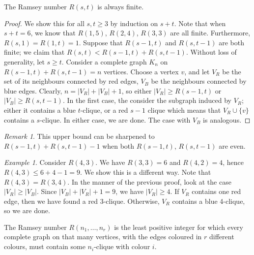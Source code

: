 \documentclass[11pt]{article}
\theoremstyle{definition}
\theoremstyle{remark}
\newtheorem*{remark}{Remark}
\newtheorem*{example}{Example}
\numberwithin{equation}{section}
\begin{document}
    \begin{theorem}
        The Ramsey number $R(s, t)$ is always finite.
    \end{theorem}
    \begin{proof}
        We show this for all $s, t \geq 3$ by induction on $s + t$. Note that when $s
        + t = 6$, we know that $R(1, 5)$, $R(2, 4)$, $R(3, 3)$ are all finite.
        Furthermore, $R(s, 1) = R(1, t) = 1$. Suppose that $R(s - 1, t)$ and $R(s, t
        - 1)$ are both finite; we claim that $R(s, t) < R(s - 1, t) + R(s, t - 1)$.
        Without loss of generality, let $s \geq t$. Consider a complete graph $K_n$ on
        $R(s - 1, t) + R(s, t - 1) = n$ vertices. Choose a vertex $v$, and let $V_R$
        be the set of its neighbours connected by red edges, $V_B$ be the neighbours
        connected by blue edges. Clearly, $n = |V_R| + |V_B| + 1$, so either $|V_R|
        \geq R(s - 1, t)$ or $|V_B| \geq R(s, t - 1)$. In the first case, the
        consider the subgraph induced by $V_R$; either it contains a blue $t$-clique,
        or a red $s - 1$ clique which means that $V_R \cup \{v\}$ contains a
        $s$-clique. In either case, we are done. The case with $V_B$ is analogous.
    \end{proof}
    \begin{remark}
        This upper bound can be sharpened to $R(s - 1, t) + R(s, t - 1) - 1$ when
        both $R(s - 1, t)$, $R(s, t - 1)$ are even.
    \end{remark}
    \begin{example}
        Consider $R(4, 3)$. We have $R(3, 3) = 6$ and $R(4, 2) = 4$, hence $R(4, 3)
        \leq 6 + 4 - 1 = 9$. We show this is a different way. Note that $R(4, 3) =
        R(3, 4)$. In the manner of the previous proof, look at the case $|V_R| \geq
        |V_B|$. Since $|V_B| + |V_R| + 1 = 9$, we have $|V_R| \geq 4$. If $V_R$
        contains one red edge, then we have found a red 3-clique. Otherwise, $V_R$
        contains a blue 4-clique, so we are done.
    \end{example}

    \begin{definition}
        The Ramsey number $R(n_1, \dots, n_r)$ is the least positive integer for
        which every complete graph on that many vertices, with the edges coloured in
        $r$ different colours, must contain some $n_i$-clique with colour $i$.
    \end{definition}
\end{document}
